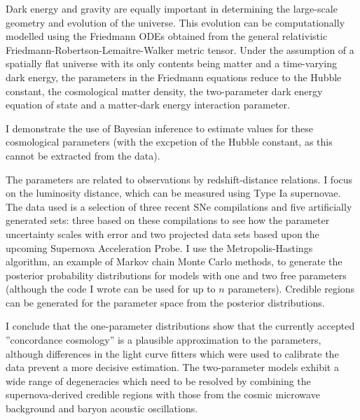    Dark energy and gravity are equally important in determining the large-scale geometry and evolution of the universe. This evolution can be computationally modelled using the Friedmann ODEs obtained from the general relativistic Friedmann-Robertson-Lemaitre-Walker metric tensor.  Under the assumption of a spatially flat universe with its only contents being matter and a time-varying dark energy, the parameters in the Friedmann equations reduce to the Hubble constant, the cosmological matter density, the two-parameter dark energy equation of state and a matter-dark energy interaction parameter. 

   I demonstrate the use of Bayesian inference to estimate values for these cosmological parameters (with the excpetion of the Hubble constant, as this cannot be extracted from the data). 

   The parameters are related to observations by redshift-distance relations. I focus on the luminosity distance, which can be measured using Type Ia supernovae. The data used is a selection of three recent SNe compilations and five artificially generated sets: three based on these compilations to see how the parameter uncertainty scales with error and two projected data sets based upon the upcoming Supernova Acceleration Probe. I use the Metropolis-Hastings algorithm, an example of Markov chain Monte Carlo methods, to generate the posterior probability distributions for models with one and two free parameters (although the code I wrote can be used for up to $n$ parameters). Credible regions can be generated for the parameter space from the posterior distributions. 

   I conclude that the one-parameter distributions show that the currently accepted ”concordance cosmology” is a plausible approximation to the parameters, although differences in the light curve fitters which were used to calibrate the data prevent a more decisive estimation. The two-parameter models exhibit a wide range of degeneracies which need to be resolved by combining the supernova-derived credible regions with those from the cosmic microwave background and baryon acoustic oscillations.


